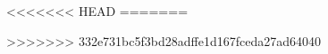 
\newcommand{\kLanguage}{eng}

\newcommand{\kLoesungen}{true}

\newcommand{\kAufgabenNiveau}{auchTraining}

\newcommand{\kMMPapier}{false}

<<<<<<< HEAD
=======
\newcommand{\kVersion}{V0.0.1 Nov. 2023}



\newcommand{\kDraftKommentare}{true}

>>>>>>> 332e731bc5f3bd28adffe1d167fceda27ad64040
